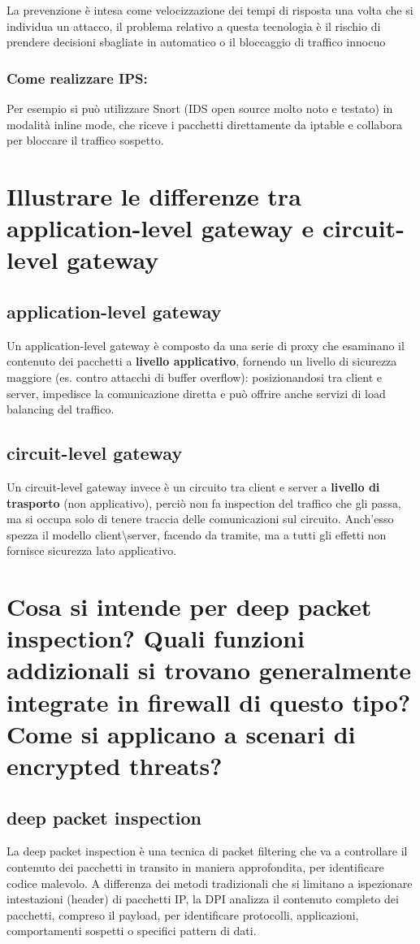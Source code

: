 \documentclass{report}
\begin{document}
\noindent La prevenzione è intesa come velocizzazione dei tempi di risposta una volta che si individua un attacco, il problema relativo a questa tecnologia è il rischio di prendere decisioni sbagliate in automatico o il bloccaggio
di traffico innocuo
\subsubsection{Come realizzare IPS:}
Per esempio si può utilizzare Snort (IDS open source molto noto e testato) in modalità inline mode, che riceve i pacchetti direttamente da iptable e collabora per bloccare il
traffico sospetto.


\section{Illustrare le differenze tra application-level gateway e circuit-level gateway}
\subsection{application-level gateway}
Un application-level gateway è composto da una serie di proxy che esaminano il contenuto dei pacchetti a \textbf{livello applicativo}, fornendo un livello di sicurezza maggiore (es. contro attacchi di buffer overflow): 
posizionandosi tra client e server, impedisce la comunicazione diretta e può offrire anche servizi di load balancing del traffico.

\subsection{circuit-level gateway}
Un circuit-level gateway invece è un circuito tra client e server a  \textbf{livello di trasporto} (non applicativo), perciò non fa inspection del traffico che gli passa, ma si occupa solo di tenere traccia delle comunicazioni sul circuito. 
Anch'esso spezza il modello client\textbackslash server, facendo da tramite, ma a tutti gli effetti non fornisce sicurezza lato applicativo.

\section{Cosa si intende per deep packet inspection? Quali funzioni addizionali si trovano
generalmente integrate in firewall di questo tipo? Come si applicano a scenari di encrypted threats?}
\subsection{deep packet inspection}
La deep packet inspection è una tecnica di packet filtering che va a controllare il contenuto dei pacchetti in transito in maniera approfondita, per identificare codice malevolo.
A differenza dei metodi tradizionali che si limitano a ispezionare intestazioni (header) di pacchetti IP, la DPI analizza il contenuto completo dei pacchetti, compreso il payload, per identificare protocolli, applicazioni, comportamenti sospetti o specifici pattern di dati.
\end{document}
